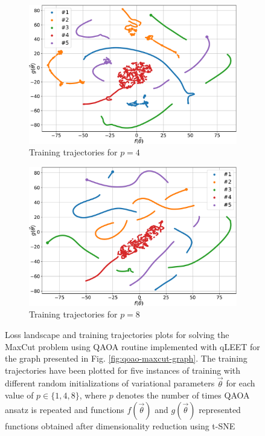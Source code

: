 \documentclass[%
 reprint,
 amsmath,
 amssymb,
 showkeys,
 pra,
 floatfix,
]{revtex4-2}
\begin{document}
\begin{figure}[htp]
\begin{subfigure}[b]{0.32\linewidth}
        \includegraphics[width=\textwidth]{images/training_trajectory_p2.pdf}
        \caption{Training trajectories for $p=4$\label{fig:train-p4}}
    \end{subfigure}
    \begin{subfigure}[b]{0.32\linewidth}
        \includegraphics[width=\textwidth]{images/training_trajectory_p3.pdf}
        \caption{Training trajectories for $p=8$\label{fig:train-p8}}
    \end{subfigure}%
    \caption{Loss landscape and training trajectories plots for solving the MaxCut problem using QAOA routine implemented with qLEET for the graph presented in Fig. \ref{fig:qoao-maxcut-graph}. The training trajectories have been plotted for five instances of training with different random initializations of variational parameters $\vec{\theta}$ for each value of $p\in\{1, 4, 8\}$, where $p$ denotes the number of times QAOA ansatz is repeated and functions $f(\vec{\theta})$ and $g(\vec{\theta})$ represented functions obtained after dimensionality reduction using t-SNE}
    \label{fig:loss-land-train-traj}
\end{figure}
\end{document}

